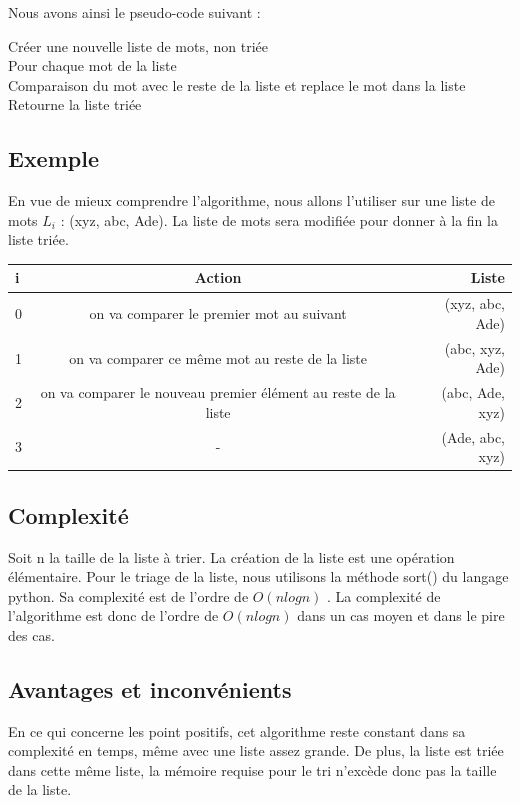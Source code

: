 \documentclass[12pt]{article}
\begin{document}
Nous avons ainsi le pseudo-code suivant :

\begin{tcolorbox}
Créer une nouvelle liste de mots, non triée \\
 

Pour chaque mot de la liste\\
\hspace*{1.0 cm} Comparaison du mot avec le reste de la liste et replace le mot dans la liste\\

Retourne la liste triée\\
\end{tcolorbox}

\subsection{Exemple}
\hspace{1.0 cm} En vue de mieux comprendre l'algorithme, nous allons l'utiliser sur une liste de mots $ L_{i} $ : (xyz, abc, Ade). La liste de mots sera modifiée pour donner à la fin la liste triée.

\vspace{0.5 cm}

\begin{tabular}{|l|c|r|}
  \hline
  i & Action & Liste \\
  \hline
  0 &		on va comparer le premier mot au suivant & (xyz, abc, Ade)\\
  1 &		on va comparer ce même mot au reste de la liste &	(abc, xyz, Ade)\\
  2 &		on va comparer le nouveau premier élément au reste de la liste &	(abc, Ade, xyz)\\
  3 &		 - &	(Ade, abc, xyz)\\
  \hline
\end{tabular}

\subsection{Complexité}
\hspace{1.0 cm} Soit n la taille de la liste à trier. La  création de la liste est une opération élémentaire. Pour le triage de la liste, nous utilisons la méthode sort() du langage python. Sa complexité est de l'ordre de $ O(n log n) $ . La complexité de l'algorithme est donc de l'ordre de $ O(n log n)$ dans un cas moyen et dans le pire des cas.

\subsection{Avantages et inconvénients}
\hspace{1.0 cm} En ce qui concerne les point positifs, cet algorithme reste constant dans sa complexité en temps, même avec une liste assez grande. De plus, la liste est triée dans cette même liste, la mémoire requise pour le tri n'excède donc pas la taille de la liste.
\end{document}
